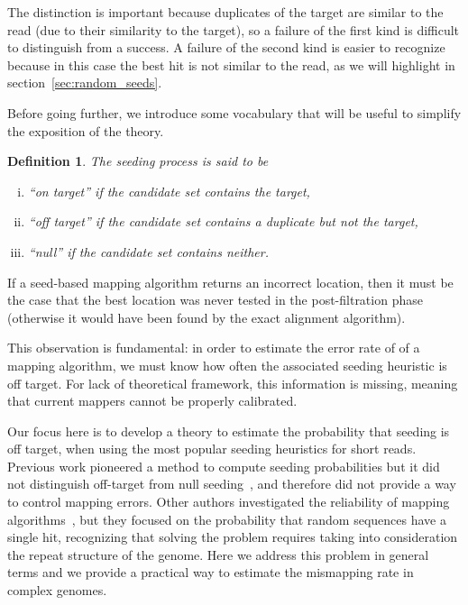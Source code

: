 \documentclass{article}
\newtheorem{definition}{Definition}
\begin{document}
The distinction is important because duplicates of the target are similar
to the read (due to their similarity to the target), so a failure of the
first kind is difficult to distinguish from a success. A failure of the
second kind is easier to recognize because in this case the best hit is
not similar to the read, as we will highlight in
section~\ref{sec:random_seeds}.

Before going further, we introduce some vocabulary that will be useful to
simplify the exposition of the theory.

\begin{definition}
The seeding process is said to be
\begin{enumerate}[i)]
\item ``on target'' if the candidate set contains the target,
\item ``off target'' if the candidate set contains a duplicate but
not the target, 
\item ``null'' if the candidate set contains neither.
\end{enumerate}
\end{definition}

If a seed-based mapping algorithm returns an incorrect location, then it
must be the case that the best location was never tested in the
post-filtration phase (otherwise it would have been found by the exact
alignment algorithm).

This observation is fundamental: in order to estimate the error rate of of
a mapping algorithm, we must know how often the associated seeding
heuristic is off target. For lack of theoretical framework, this
information is missing, meaning that current mappers cannot be properly
calibrated.

Our focus here is to develop a theory to estimate the probability that
seeding is off target, when using the most popular seeding heuristics for
short reads. Previous work pioneered a method to compute seeding
probabilities but it did not distinguish off-target from null
seeding~\cite{filion2017analytic,filion2018analytic}, and therefore did
not provide a way to control mapping errors. Other authors investigated
the reliability of mapping algorithms~\cite{pmid23872968}, but they
focused on the probability that random sequences have a single hit,
recognizing that solving the problem requires taking into consideration
the repeat structure of the genome. Here we address this problem in
general terms and we provide a practical way to estimate the mismapping
rate in complex genomes.
\end{document}
